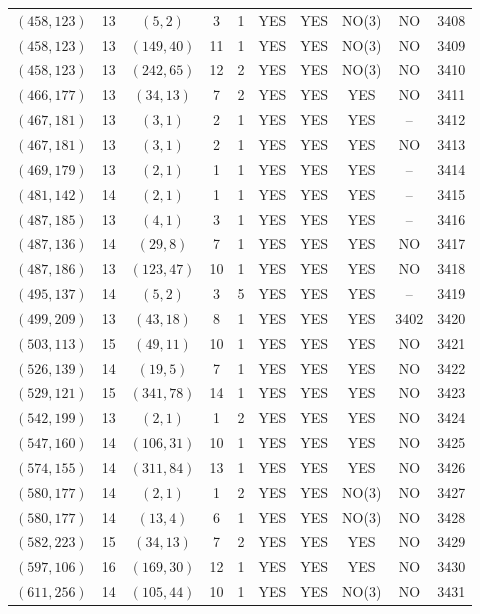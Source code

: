 \begin{longtable}{|c|c|c|c|c|c|c|c|c|c|}
$(458, 123)$ & 13 & $(5, 2)$ & 3 & 1 & YES & YES & NO(3) & NO & 3408\\
$(458, 123)$ & 13 & $(149, 40)$ & 11 & 1 & YES & YES & NO(3) & NO & 3409\\
$(458, 123)$ & 13 & $(242, 65)$ & 12 & 2 & YES & YES & NO(3) & NO & 3410\\
$(466, 177)$ & 13 & $(34, 13)$ & 7 & 2 & YES & YES & YES & NO & 3411\\
$(467, 181)$ & 13 & $(3, 1)$ & 2 & 1 & YES & YES & YES & -- & 3412\\
$(467, 181)$ & 13 & $(3, 1)$ & 2 & 1 & YES & YES & YES & NO & 3413\\
$(469, 179)$ & 13 & $(2, 1)$ & 1 & 1 & YES & YES & YES & -- & 3414\\
$(481, 142)$ & 14 & $(2, 1)$ & 1 & 1 & YES & YES & YES & -- & 3415\\
$(487, 185)$ & 13 & $(4, 1)$ & 3 & 1 & YES & YES & YES & -- & 3416\\
$(487, 136)$ & 14 & $(29, 8)$ & 7 & 1 & YES & YES & YES & NO & 3417\\
$(487, 186)$ & 13 & $(123, 47)$ & 10 & 1 & YES & YES & YES & NO & 3418\\
$(495, 137)$ & 14 & $(5, 2)$ & 3 & 5 & YES & YES & YES & -- & 3419\\
$(499, 209)$ & 13 & $(43, 18)$ & 8 & 1 & YES & YES & YES & 3402 & 3420\\
$(503, 113)$ & 15 & $(49, 11)$ & 10 & 1 & YES & YES & YES & NO & 3421\\
$(526, 139)$ & 14 & $(19, 5)$ & 7 & 1 & YES & YES & YES & NO & 3422\\
$(529, 121)$ & 15 & $(341, 78)$ & 14 & 1 & YES & YES & YES & NO & 3423\\
$(542, 199)$ & 13 & $(2, 1)$ & 1 & 2 & YES & YES & YES & NO & 3424\\
$(547, 160)$ & 14 & $(106, 31)$ & 10 & 1 & YES & YES & YES & NO & 3425\\
$(574, 155)$ & 14 & $(311, 84)$ & 13 & 1 & YES & YES & YES & NO & 3426\\
$(580, 177)$ & 14 & $(2, 1)$ & 1 & 2 & YES & YES & NO(3) & NO & 3427\\
$(580, 177)$ & 14 & $(13, 4)$ & 6 & 1 & YES & YES & NO(3) & NO & 3428\\
$(582, 223)$ & 15 & $(34, 13)$ & 7 & 2 & YES & YES & YES & NO & 3429\\
$(597, 106)$ & 16 & $(169, 30)$ & 12 & 1 & YES & YES & YES & NO & 3430\\
$(611, 256)$ & 14 & $(105, 44)$ & 10 & 1 & YES & YES & NO(3) & NO & 3431\\

\end{longtable}
